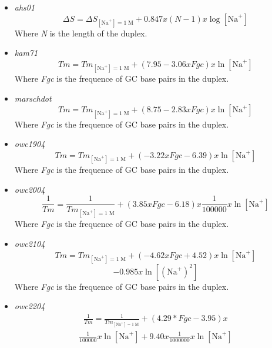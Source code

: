 \documentclass{article}
\begin{document}
 \begin{itemize}
 \item \textit{ahs01}
 \begin{displaymath}
  \Delta{}S=\Delta{}S_{[\mbox{Na}^+]=1\;\mathrm{M}}+0.847 x (N - 1) x \log [\mbox{Na}^+]   
 \end{displaymath}
 Where \emph{N} is the length of the duplex.
 \item \textit{kam71}
 \begin{displaymath}
  Tm=Tm_{[\mbox{Na}^+]=1\;\mathrm{M}}+(7.95 - 3.06 x Fgc) x \ln [\mbox{Na}^+]  
 \end{displaymath}
 Where \emph{Fgc} is the frequence of GC base pairs in the duplex.
 \item \textit{marschdot}
 \begin{displaymath}
  Tm=Tm_{[\mbox{Na}^+]=1\;\mathrm{M}}+ (8.75 - 2.83 x Fgc) x \ln [\mbox{Na}^+]  
 \end{displaymath}
 Where \emph{Fgc} is the frequence of GC base pairs in the duplex.
 \item \textit{owc1904}
 \begin{displaymath}
  Tm=Tm_{[\mbox{Na}^+]=1\;\mathrm{M}}+ (-3.22 x Fgc - 6.39) x \ln [\mbox{Na}^+]  
 \end{displaymath}
 Where \emph{Fgc} is the frequence of GC base pairs in the duplex.
 \item \textit{owc2004}
 \begin{displaymath}
 \frac{1}{Tm}=\frac{1}{Tm_{[\mbox{Na}^+]=1\;\mathrm{M}}}+ (3.85 x Fgc - 6.18) x \frac{1}{100000} x \ln [\mbox{Na}^+]  
 \end{displaymath}
 Where \emph{Fgc} is the frequence of GC base pairs in the duplex.
 \item \textit{owc2104}
 \begin{displaymath}
 Tm=Tm_{[\mbox{Na}^+]=1\;\mathrm{M}}+ (-4.62 x Fgc + 4.52) x \ln [\mbox{Na}^+] 
 \end{displaymath}
 \begin{displaymath}
 - 0.985 x \ln [(\mbox{Na}^+)^2]  
 \end{displaymath}
 Where \emph{Fgc} is the frequence of GC base pairs in the duplex.
 \item \textit{owc2204}
 \begin{multline*}
 \frac{1}{Tm}=\frac{1}{Tm_{[\mbox{Na}^+]=1\;\mathrm{M}}}+ (4.29 * Fgc - 3.95) x 
 \end{multline*}
 \begin{multline*}
 \frac{1}{100000} x \ln [\mbox{Na}^+] +
 9.40 x \frac{1}{1000000} x \ln [\mbox{Na}^+]

\end{multline*}
\end{itemize}
\end{document}

